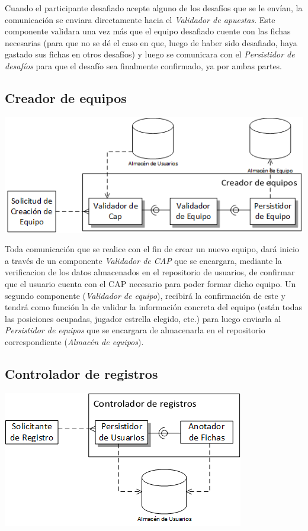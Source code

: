 Cuando el participante desafiado acepte alguno de los desafíos que se le envían, la comunicación se enviara directamente hacia el \emph{Validador de apuestas}. Este componente validara una vez más que el equipo desafiado cuente con las fichas necesarias (para que no se dé el caso en que, luego de haber sido desafiado, haya gastado sus fichas en otros desafíos) y luego se comunicara con el \emph{Persistidor de desafíos} para que el desafío sea finalmente confirmado, ya por ambas partes.

\subsection{Creador de equipos}
\begin{center}
\includegraphics[scale=0.80]{diagramas/tp1/equipo.png}
\end{center}
\label{fig:equipo}

Toda comunicación que se realice con el fin de crear un nuevo equipo, dará inicio a través de un componente \emph{Validador de CAP} que se encargara, mediante la verificacion de los datos almacenados en el repositorio de usuarios, de confirmar que el usuario cuenta con el CAP necesario para poder formar dicho equipo. Un segundo componente (\emph{Validador de equipo}), recibirá la confirmación de este y tendrá como función la de validar la información concreta del equipo (están todas las posiciones ocupadas, jugador estrella elegido, etc.) para luego enviarla al \emph{Persistidor de equipos} que se encargara de almacenarla en el repositorio correspondiente (\emph{Almacén de equipos}).

\subsection{Controlador de registros}
\begin{center}
\includegraphics[scale=0.80]{diagramas/tp1/registros.png}
\end{center}
\label{fig:registros}

